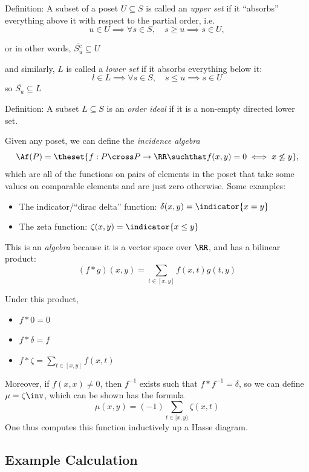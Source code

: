 Definition: A subset of a poset \(U \subseteq S\) is called an
\emph{upper set} if it ``absorbs'' everything above it with respect to
the partial order, i.e. \[
u\in U \implies \forall s\in S, \quad s \geq u \implies s \in U,
\]

or in other words, \(\overline{S_u^c} \subseteq U\)

and similarly, \(L\) is called a \emph{lower set} if it absorbs
everything below it: \[
l \in L \implies \forall s\in S, \quad s \leq u \implies s \in U
\] so \(\overline{S_u} \subseteq L\)

Definition: A subset \(L \subseteq S\) is an \emph{order ideal} if it is
a non-empty directed lower set.

Given any poset, we can define the \emph{incidence algebra} \[
\Af(P) = \theset{f: P \cross P \to \RR \suchthat f(x,y) = 0 \iff x \not\leq y },
\] which are all of the functions on pairs of elements in the poset that
take some values on comparable elements and are just zero otherwise.
Some examples:

\begin{itemize}
\tightlist
\item
  The indicator/``dirac delta'' function:
  \(\delta(x,y) = \indicator{x=y}\)
\item
  The zeta function: \(\zeta(x,y) = \indicator{x \leq y}\)
\end{itemize}

This is an \emph{algebra} because it is a vector space over \(\RR\), and
has a bilinear product: \[
(f \ast g)(x, y) = \sum_{t\in[x,y]}f(x,t) g(t, y)
\]

Under this product,

\begin{itemize}
\tightlist
\item
  \(f\ast 0 = 0\)
\item
  \(f\ast\delta = f\)
\item
  \(f\ast \zeta = \displaystyle\sum_{t\in[x,y]}f(x,t)\)
\end{itemize}

Moreover, if \(f(x,x) \neq 0\), then \(f^{-1}\) exists such that
\(f\ast f^{-1} = \delta\), so we can define \(\mu = \zeta\inv\), which
can be shown has the formula \[
\mu(x,y) = (-1)\sum_{ t \in [x,y)}\zeta(x, t)
\] One thus computes this function inductively up a Hasse diagram.

\hypertarget{example-calculation}{%
\subsection{Example Calculation}\label{example-calculation}}

